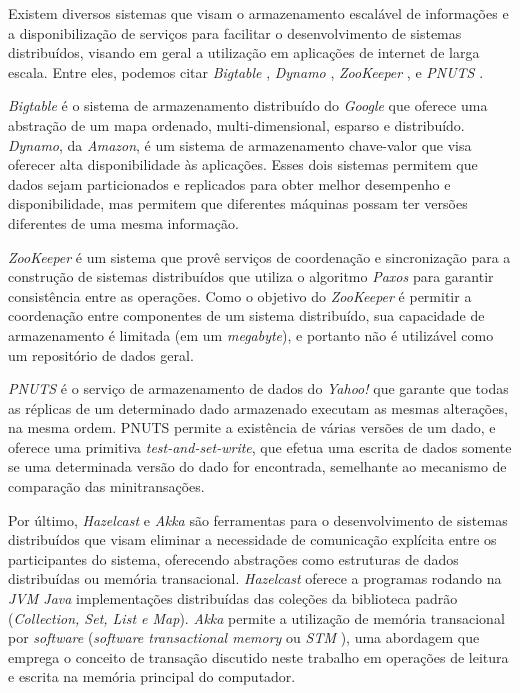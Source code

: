 \documentclass[11pt,twoside,a4paper]{book}
\begin{document}
Existem diversos sistemas que visam o armazenamento escalável de informações e a disponibilização de serviços para facilitar o 
desenvolvimento de sistemas distribuídos, visando em geral a utilização em aplicações de internet de larga escala. Entre eles, 
podemos citar \emph{Bigtable} \cite{bigtable}, \emph{Dynamo} \cite{dynamo},
\emph{ZooKeeper} \cite{zookeeper}, e \emph{PNUTS} \cite{pnuts}.

\emph{Bigtable} é o sistema de armazenamento distribuído do \emph{Google} que
oferece uma abstração de um mapa ordenado, multi-dimensional, esparso e
distribuído. \emph{Dynamo}, da \emph{Amazon}, é um sistema de armazenamento
chave-valor que visa oferecer alta disponibilidade às aplicações. Esses dois sistemas permitem que dados sejam
particionados e replicados para obter melhor desempenho e disponibilidade, mas
permitem que diferentes máquinas possam ter versões diferentes de uma mesma informação.

\emph{ZooKeeper} é um sistema que provê serviços de coordenação e sincronização
para a construção de sistemas distribuídos que utiliza o algoritmo \emph{Paxos}
\cite{paxos} para garantir consistência entre as operações. Como o objetivo do
\emph{ZooKeeper} é permitir a coordenação entre componentes de um sistema
distribuído, sua capacidade de armazenamento é limitada (em um \emph{megabyte}), e portanto não é utilizável como um 
repositório de dados geral.

\emph{PNUTS} é o serviço de armazenamento de dados do \emph{Yahoo!} que garante
que todas as réplicas de um determinado dado armazenado executam as mesmas alterações, na mesma ordem. PNUTS permite a 
existência de várias versões de um dado, e oferece uma primitiva \emph{test-and-set-write}, que efetua uma escrita de dados 
somente se uma determinada versão do dado for encontrada, semelhante ao mecanismo de comparação das minitransações.

Por último, \emph{Hazelcast} \cite{hazelcast} e \emph{Akka} \cite{akka} são
ferramentas para o desenvolvimento de sistemas distribuídos que visam eliminar a necessidade de comunicação explícita entre os 
participantes do sistema, oferecendo abstrações como estruturas de dados
distribuídas ou memória transacional. \emph{Hazelcast} oferece a programas
rodando na \emph{JVM Java} implementações distribuídas das coleções da biblioteca padrão (\emph{Collection, Set, List e Map}). 
\emph{Akka} permite a utilização de memória transacional por \emph{software}
(\emph{software transactional memory} ou \emph{STM} \cite{stm}), uma abordagem que emprega o conceito de transação discutido 
neste trabalho em operações de leitura e escrita na memória principal do computador.
\end{document}
